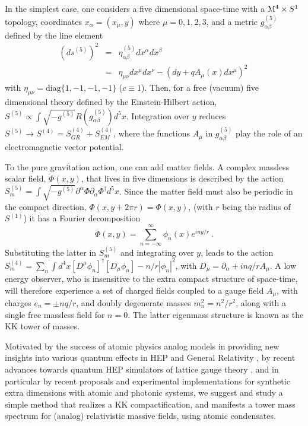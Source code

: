 \documentclass[aps,prl,twocolumn,unsortedaddress,superscriptaddress]{revtex4-1}
\begin{document}
In the simplest case, one considers a five dimensional space-time with a ${\rm M}^4\times S^1$ topology, coordinates $x_{\alpha}=(x_\mu,y)$ where $\mu=0,1,2,3$, and a metric
$g^{(5)}_{\alpha\beta}$ defined by the line element
\begin{eqnarray}
(ds^{(5)})^2&=&\eta_{\alpha\beta}^{(5)}d x^\alpha d x^\beta\\
&=&\eta_{\mu\nu}d x^\mu d x^\nu - (dy+ q A_\mu(x) dx^\mu)^2~\nonumber 
\end{eqnarray}
with $\eta_{\mu\nu}=\text{diag}\lbrace 1,-1,-1,-1\rbrace$ ($c\equiv 1$).
Then, for a free (vacuum) five dimensional theory  defined by the Einstein-Hilbert  action, $S^{(5)}\propto \int  \sqrt{-g^{(5)}} R(g^{(5)}_{\alpha\beta}) d^5 x$. Integration over $y$ reduces $ S^{(5)}\to S^{(4)}=S_{GR}^{(4)}+S_{EM}^{(4)}$, where the functions $A_\mu$ in $g^{(5)}_{\alpha\beta}$ play the role of an electromagnetic vector potential.

To the pure gravitation action, one can add matter fields. A complex massless scalar field, $\Phi(x,y)$, that lives in five dimensions is described by the action $S_m^{(5)} = \int \sqrt{-g^{(5)}} \partial^\alpha\Phi \partial_\alpha\Phi^\dagger d^5x $. Since the matter field must also be periodic in the compact direction, $\Phi(x,y+2\pi r)=\Phi(x,y)$, (with $r$ being the radius of $S^{(1)}$) it has a Fourier decomposition
\begin{equation}\label{5d_field}
\Phi(x,y)=\sum_{n=-\infty}^{\infty} \phi_n(x)e^{i  {n y/r}}~.
\end{equation} 
Substituting the latter in $S_m^{(5)}$ and integrating over $y$, leads to the action $S_m^{(4)}=\sum_n\int d^{4}x [D^\mu\phi_n]^{\dagger}[D_\mu\phi_n]-n/r|\phi_n|^2$, with $D_\mu=\partial_\alpha + inq/r A_\mu$.
A low energy observer, who is insensitive to the extra compact structure of space-time, will therefore experience a set of charged fields coupled to a gauge field $A_\mu$, with charges $e_n=\pm nq/r$, and doubly degenerate masses $m_n^2=n^2/r^2$, along with a single free massless field for $n=0$. The latter eigenmass structure is known as the KK tower of masses.

Motivated by the success of atomic physics analog models in providing new insights into various quantum effects 
 in HEP and General Relativity  \cite{Barcelo2,Visser,Unruh,GarayPRA,Fedichev,Fischer,Barcelo2,BenniH,Reznik2000,Horstmann2010,Horstmann2011,Szpak}, by recent advances towards quantum HEP simulators of lattice gauge theory \cite{Cirac2010,ErezPrl,mazza2012optical,Zoller2012,ErezRevA,Erez2015,Wiese}, and in particular by recent proposals \cite{lewenstein2012,celi2015,carusottoQH4D,goldman2017} and experimental implementations \cite{celiScience2015,lensSience2015,spilmanSienec2015,lens2016,gadwaySience2017} for synthetic extra dimensions with atomic and photonic \cite{carusotto2016,carusotto2017} systems, we suggest and study a simple method that realizes a KK compactification, and manifests a tower mass spectrum  for (analog) relativistic massive fields, using atomic condensates.
\end{document}
